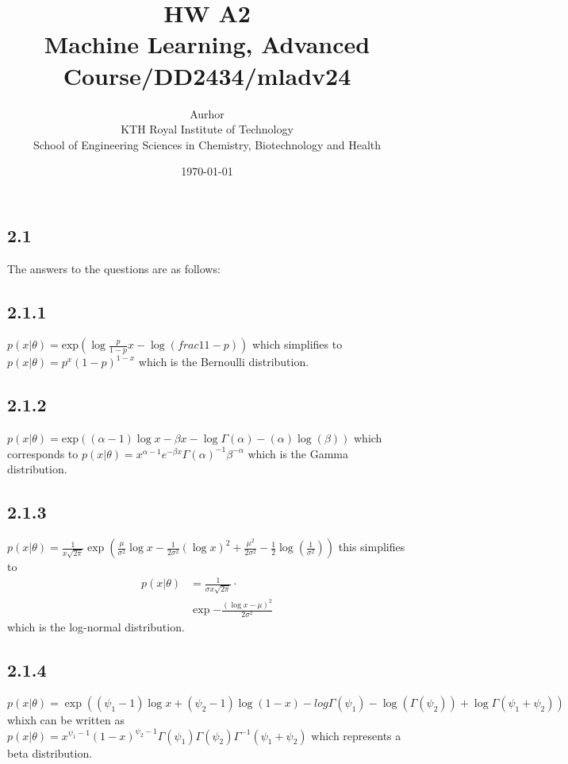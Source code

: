 \documentclass{article}
\title{HW A2\\\Large{Machine Learning, Advanced Course/DD2434/mladv24}}
\author{Aurhor \\ KTH Royal Institute of Technology\\ School of Engineering Sciences in Chemistry, Biotechnology and Health}
\date{\today}
\begin{document}
\maketitle

\fancyfoot[C]{\thepage}
\begin{multicols}{2}

    \section*{2.1}
    The answers to the questions are as follows:

    \subsection*{2.1.1}
    $p(x|\theta) = \text{exp}(\log \frac{p}{1-p} x -\log(frac{1}{1-p}))$ which simplifies to $p(x|\theta) =p^x(1-p)^{1-x}$
    which is the Bernoulli distribution.

    \subsection*{2.1.2}
    $p(x|\theta) = \text{exp}((\alpha-1)\log x - \beta x - \log \Gamma (\alpha)-(\alpha)\log(\beta))$ which corresponds to
    $p(x|\theta) = x^{\alpha-1} e^{-\beta x} \Gamma(\alpha)^{-1}\beta^{-\alpha}$  which is the Gamma distribution.

    \subsection*{2.1.3}
    $p(x|\theta) = \frac{1}{x \sqrt{2\pi}} \exp (\frac{\mu}{\sigma^2} \log x - \frac{1}{2\sigma^2} (\log x)^2 + \frac{\mu^2}{2 \sigma^2} - \frac{1}{2} \log (\frac{1}{\sigma^2})) $ this simplifies to
    \begin{equation*}
        \begin{aligned}
            p(x|\theta) &= \frac{1}{\sigma x \sqrt{2\pi}} \cdot \\
            &\exp {-\frac{(\log x - \mu)^2}{2 \sigma^2}}
        \end{aligned}    
    \end{equation*}
    which is the log-normal distribution.

    \subsection*{2.1.4}
    $p(x|\theta) = \exp( (\psi_1 - 1) \log x + (\psi_2-1)\log(1-x) - log\Gamma(\psi_1)-\log(\Gamma(\psi_2))+\log \Gamma(\psi_1+\psi_2))$
    whixh can be written as $p(x|\theta) = x^{\psi_1-1}(1-x)^{\psi_2-1} \Gamma(\psi_1)\Gamma(\psi_2)\Gamma^{-1}(\psi_1+\psi_2)$ which
    represents a beta distribution.

\end{multicols}
\end{document}

